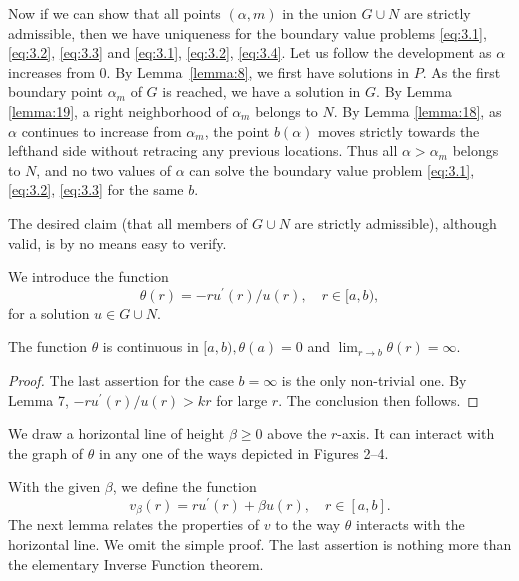 Now if we can show that all points $(\alpha, m)$ in the union $G \cup N$ are strictly 
admissible, then we have uniqueness for the boundary value problems
\eqref{eq:3.1}, \eqref{eq:3.2}, \eqref{eq:3.3}
and \eqref{eq:3.1}, \eqref{eq:3.2}, \eqref{eq:3.4}.
Let us follow the development as $\alpha$ increases from 0.
By Lemma~\ref{lemma:8}, we first have solutions in $P$.
As the first boundary point $\alpha_m$ of $G$ is reached,
we have a solution in $G$. By Lemma \ref{lemma:19}, a right neighborhood of $\alpha_m$
belongs to $N$. By Lemma \ref{lemma:18}, as $\alpha$ continues to increase from $\alpha_m$,
the point $b(\alpha)$ moves strictly towards the lefthand side without retracing
any previous locations. Thus all $\alpha>\alpha_m$ belongs to $N$, and no two values of
$\alpha$ can solve the boundary value problem
\eqref{eq:3.1}, \eqref{eq:3.2}, \eqref{eq:3.3} for the same $b$.

The desired claim (that all members of $G \cup N$ are strictly admissible), although valid,
is by no means easy to verify.

We introduce the function
\begin{equation}\label{eq:4.9}
  \theta(r)=-r u^{\prime}(r) / u(r), \quad r \in[a, b),
\end{equation}
for a solution $u \in G \cup N$.

\begin{lemma}\label{lemma:20}
  The function $\theta$ is continuous in $[a, b), \theta(a)=0$
  and $\lim _{r \rightarrow b} \theta(r)=\infty$.
\end{lemma}

\begin{proof}
  The last assertion for the case $b=\infty$ is the only non-trivial one.
  By Lemma 7, $-r u^{\prime}(r) / u(r)>k r$ for large $r$. The conclusion then follows.
\end{proof}

We draw a horizontal line of height $\beta \geq 0$ above the $r$-axis. It can interact with the graph of $\theta$ in any one of the ways depicted in Figures 2--4.

With the given $\beta$, we define the function
\begin{equation}\label{eq:4.10}
  v_\beta(r)=r u^{\prime}(r)+\beta u(r), \quad r \in[a, b].  
\end{equation}
The next lemma relates the properties of $v$ to the way $\theta$ interacts
with the horizontal line. We omit the simple proof.
The last assertion is nothing more than the elementary Inverse Function theorem.

